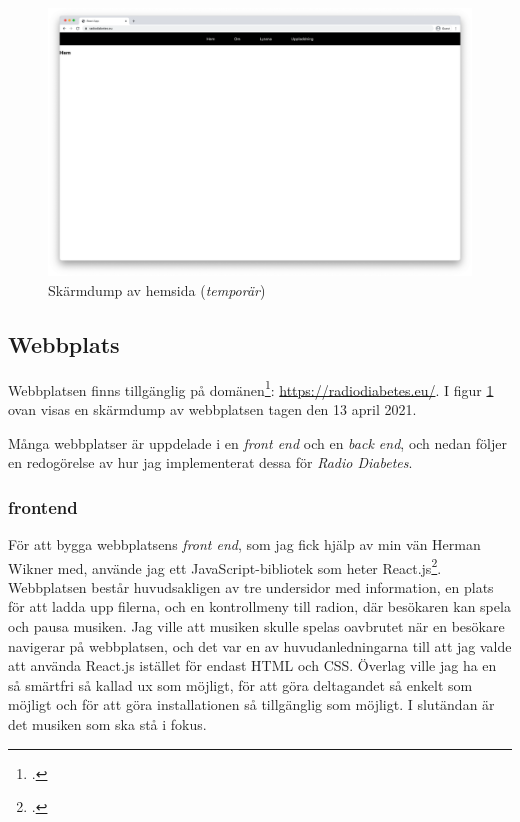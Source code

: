 \documentclass[11pt, a4paper]{article} %
\begin{document}
\begin{figure}[H]
\centering
\includegraphics[width=\textwidth]{../media/hemsida.png}
\caption{Skärmdump av hemsida (\emph{temporär})}
\label{hemsida}
\end{figure}


\subsection*{Webbplats}
Webbplatsen finns tillgänglig på domänen\footcite{jondell_radio_nodate}: \url{https://radiodiabetes.eu/}. I figur \ref{hemsida} ovan visas en skärmdump av webbplatsen tagen den 13 april 2021.

Många webbplatser är uppdelade i en \emph{front end} och en \emph{back end}, och nedan följer en redogörelse av hur jag implementerat dessa för \emph{Radio Diabetes}. 

\subsubsection*{\gls{frontend}}
För att bygga webbplatsens \emph{front end}, som jag fick hjälp av min vän Herman Wikner med, använde jag ett JavaScript-bibliotek som heter React.js\footcite{noauthor_react_nodate}. Webbplatsen består huvudsakligen av tre undersidor med information, en plats för att ladda upp filerna, och en kontrollmeny till radion, där besökaren kan spela och pausa musiken. Jag ville att musiken skulle spelas oavbrutet när en besökare navigerar på webbplatsen, och det var en av huvudanledningarna till att jag valde att använda React.js istället för endast HTML och CSS. Överlag ville jag ha en så smärtfri så kallad \gls{ux} som möjligt, för att göra deltagandet så enkelt som möjligt och för att göra installationen så tillgänglig som möjligt. I slutändan är det musiken som ska stå i fokus.
\end{document}
